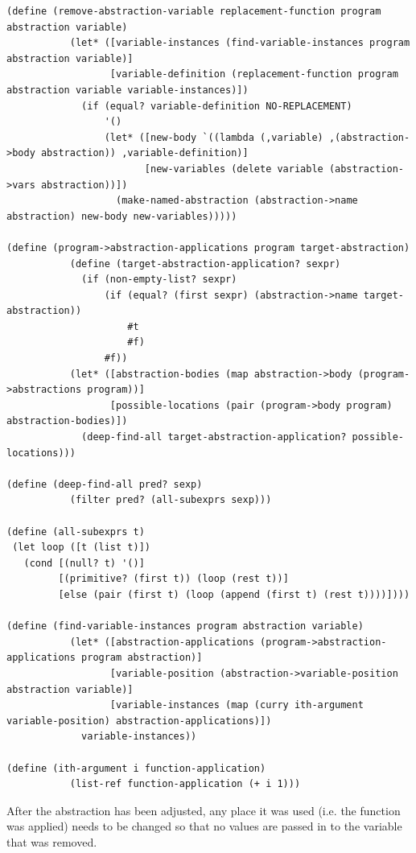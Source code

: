 \documentclass[a4paper,10pt]{article}
\begin{document}
\begin{lstlisting}[frame=trBL]
(define (remove-abstraction-variable replacement-function program abstraction variable)
           (let* ([variable-instances (find-variable-instances program abstraction variable)]
                  [variable-definition (replacement-function program abstraction variable variable-instances)])
             (if (equal? variable-definition NO-REPLACEMENT)
                 '()
                 (let* ([new-body `((lambda (,variable) ,(abstraction->body abstraction)) ,variable-definition)]
                        [new-variables (delete variable (abstraction->vars abstraction))])
                   (make-named-abstraction (abstraction->name abstraction) new-body new-variables)))))

(define (program->abstraction-applications program target-abstraction)
           (define (target-abstraction-application? sexpr)
             (if (non-empty-list? sexpr)
                 (if (equal? (first sexpr) (abstraction->name target-abstraction))
                     #t
                     #f)
                 #f))
           (let* ([abstraction-bodies (map abstraction->body (program->abstractions program))]
                  [possible-locations (pair (program->body program) abstraction-bodies)])
             (deep-find-all target-abstraction-application? possible-locations)))

(define (deep-find-all pred? sexp)
           (filter pred? (all-subexprs sexp)))

(define (all-subexprs t)
 (let loop ([t (list t)])
   (cond [(null? t) '()]
         [(primitive? (first t)) (loop (rest t))]
         [else (pair (first t) (loop (append (first t) (rest t))))])))

(define (find-variable-instances program abstraction variable)
           (let* ([abstraction-applications (program->abstraction-applications program abstraction)]
                  [variable-position (abstraction->variable-position abstraction variable)]
                  [variable-instances (map (curry ith-argument variable-position) abstraction-applications)])
             variable-instances))

(define (ith-argument i function-application)
           (list-ref function-application (+ i 1)))

\end{lstlisting}
After the abstraction has been adjusted, any place it was used (i.e. the function was applied) needs to be changed so that no values are passed in to the variable that was removed.
\end{document}
